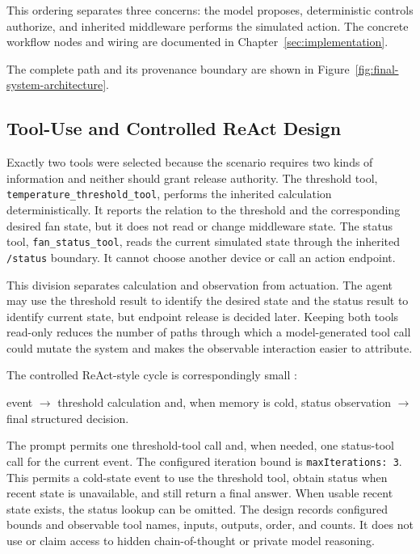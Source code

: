 This ordering separates three concerns: the model proposes, deterministic
controls authorize, and inherited middleware performs the simulated action.
The concrete workflow nodes and wiring are documented in
Chapter~\ref{sec:implementation}.

The complete path and its provenance boundary are shown in
Figure~\ref{fig:final-system-architecture}.

\subsection{Tool-Use and Controlled ReAct Design}\label{subsec:design-react}

Exactly two tools were selected because the scenario requires two kinds of
information and neither should grant release authority. The threshold tool,
\mbox{\texttt{temperature\_threshold\_tool}}, performs the inherited calculation
deterministically. It reports the relation to the threshold and the
corresponding desired fan state, but it does not read or change middleware
state. The status tool, \mbox{\texttt{fan\_status\_tool}}, reads the current
simulated state through the inherited \texttt{/status} boundary. It cannot
choose another device or call an action endpoint.

This division separates calculation and observation from actuation. The agent
may use the threshold result to identify the desired state and the status result
to identify current state, but endpoint release is decided later. Keeping both
tools read-only reduces the number of paths through which a model-generated
tool call could mutate the system and makes the observable interaction easier
to attribute.

The controlled ReAct-style cycle is correspondingly small
\cite{yao2023react,wang2024surveyagents}:

\begin{center}
event $\rightarrow$ threshold calculation and, when memory is cold, status observation
$\rightarrow$ final structured decision.
\end{center}

The prompt permits one threshold-tool call and, when needed, one status-tool
call for the current event. The configured iteration bound is
\texttt{maxIterations: 3}. This permits a cold-state event to use the threshold
tool, obtain status when recent state is unavailable, and still return a final
answer. When usable recent state exists, the status lookup can be omitted. The
design records configured bounds and
observable tool names, inputs, outputs, order, and counts. It does not use or
claim access to hidden chain-of-thought or private model reasoning.

